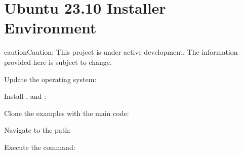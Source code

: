 \documentclass[letterpaper,10pt,english]{sphinxmanual}
\begin{document}
\section{Ubuntu 23.10 Installer Environment}
\label{\detokenize{install_linux:ubuntu-23-10-installer-environment}}
\begin{sphinxadmonition}{caution}{Caution:}
\sphinxAtStartPar
This project is under active development. The information provided here is subject to change.
\end{sphinxadmonition}

\sphinxAtStartPar
Update the operating system:

\begin{sphinxVerbatim}[commandchars=\\\{\}]
  
\end{sphinxVerbatim}

\sphinxAtStartPar
Install ,  and :

\begin{sphinxVerbatim}[commandchars=\\\{\}]
   
   
   
\end{sphinxVerbatim}

\sphinxAtStartPar
Clone the examples with the main code:

\begin{sphinxVerbatim}[commandchars=\\\{\}]
  
\end{sphinxVerbatim}

\sphinxAtStartPar
Navigate to the path:

\begin{sphinxVerbatim}[commandchars=\\\{\}]
 
\end{sphinxVerbatim}

\sphinxAtStartPar
Execute the command:

\begin{sphinxVerbatim}[commandchars=\\\{\}]
 
\end{sphinxVerbatim}
\end{document}
